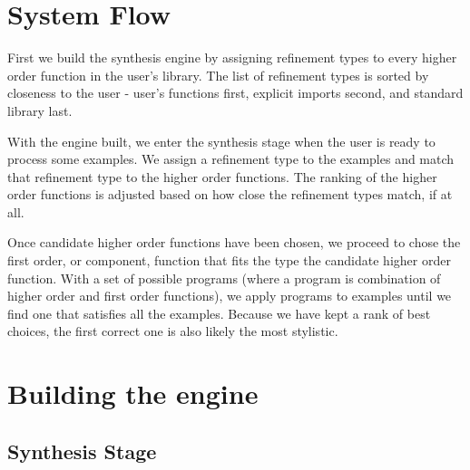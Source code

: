 \documentclass[pldi]{sigplanconf-pldi16}
\begin{document}
\section{System Flow}
First we build the synthesis engine by assigning refinement types to every higher order function in the user's library.
The list of refinement types is sorted by closeness to the user - user's functions first, explicit imports second, and standard library last.

With the engine built, we enter the synthesis stage when the user is ready to process some examples. 
We assign a refinement type to the examples and match that refinement type to the higher order functions.
The ranking of the higher order functions is adjusted based on how close the refinement types match, if at all.

Once candidate higher order functions have been chosen, we proceed to chose the first order, or component, function that fits the type the candidate higher order function.
With a set of possible programs (where a program is combination of higher order and first order functions), we apply programs to examples until we find one that satisfies all the examples.
Because we have kept a rank of best choices, the first correct one is also likely the most stylistic.

\section{Building the engine}


\subsection{Synthesis Stage}

\end{document}
